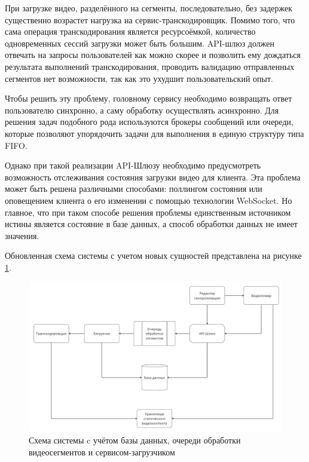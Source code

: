 	При загрузке видео, разделённого на сегменты, последовательно, без задержек существенно возрастет нагрузка на сервис-транскодировщик. Помимо того, что сама операция транскодирования является ресурсоёмкой, количество одновременных сессий загрузки может быть большим. API-шлюз должен отвечать на запросы пользователей как можно скорее и позволить ему дождаться результата выполнений транскодирования, проводить валидацию отправленных сегментов нет возможности, так как это ухудшит пользовательский опыт.

	Чтобы решить эту проблему, головному сервису необходимо возвращать ответ пользователю синхронно, а саму обработку осуществлять асинхронно. Для решения задач подобного рода используются брокеры сообщений или очереди, которые позволяют упорядочить задачи для выполнения в единую структуру типа FIFO.

	Однако при такой реализации API-Шлюзу необходимо предусмотреть возможность отслеживания состояния загрузки видео для клиента. Эта проблема может быть решена различными способами: поллингом состояния или оповещением клиента о его изменении с помощью технологии WebSocket. Но главное, что при таком способе решения проблемы единственным источником истины является состояние в базе данных, а способ обработки данных не имеет значения.

	Обновленная схема системы с учетом новых сущностей представлена на рисунке \ref{fig:system_scheme_4}.

	\begin{figure}[ht!] 
		\center
		\includegraphics [scale=0.33] {my_folder/images//system_scheme_4}
		\caption{Схема системы c учётом базы данных, очереди обработки видеосегментов и сервисом-загрузчиком} 
		\label{fig:system_scheme_4}  
	\end{figure}

